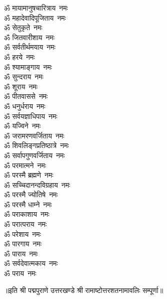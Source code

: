\begin{multicols}{2}
\begin{flushleft}
ॐ मायामानुषचारित्राय~नमः\\
ॐ महादेवादिपूजिताय~नमः\\
ॐ सेतुकृते~नमः\\
ॐ जितवारीशाय~नमः\\
ॐ सर्वतीर्थमयाय~नमः\\
ॐ हरये~नमः\\
ॐ श्यामाङ्गाय~नमः\\
ॐ सुन्दराय~नमः\\
ॐ शूराय~नमः\\
ॐ पीतवाससे~नमः\hfill{}\\
ॐ धनुर्धराय~नमः\\
ॐ सर्वयज्ञाधिपाय~नमः\\
ॐ यज्विने~नमः\\
ॐ जरामरणवर्जिताय~नमः\\
ॐ शिवलिङ्गप्रतिष्ठात्रे~नमः\\
ॐ सर्वापगुणवर्जिताय~नमः\\
ॐ परमात्मने~नमः\\
ॐ परस्मै ब्रह्मणे~नमः\\
ॐ सच्चिदानन्दविग्रहाय~नमः\\
ॐ परस्मै ज्योतिषे~नमः\hfill{}\\
ॐ परस्मै धाम्ने~नमः\\
ॐ पराकाशाय~नमः\\
ॐ परात्पराय~नमः\\
ॐ परेशाय~नमः\\
ॐ पारगाय~नमः\\
ॐ पाराय~नमः\\
ॐ सर्वदेवात्मकाय~नमः\\
ॐ पराय~नमः\\
\end{flushleft}
\end{multicols}
॥इति श्री पद्मपुराणे उत्तरखण्डे श्री रामाष्टोत्तरशतनामावलिः सम्पूर्णा॥
